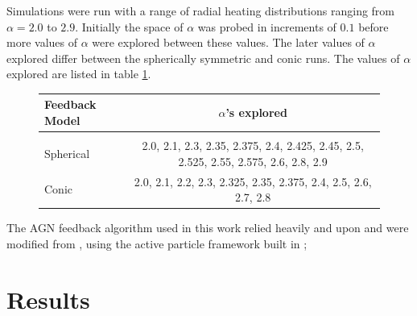 \documentclass[iop,apjl, twocolappendix]{emulateapj}   %
\begin{document}
Simulations were run with a range of radial heating distributions ranging from
$\alpha = 2.0$ to $2.9$. Initially the space of $\alpha$ was probed in
increments of $0.1$ before more values of $\alpha$ were explored between these
values. The later values of $\alpha$ explored differ between the spherically
symmetric and conic runs. The values of $\alpha$ explored are listed in table
\ref{tab:alphas}.

\begin{figure}
  \begin{center}
  \caption{\label{tab:alphas}
  }
  \begin{tabular}{ l c }
Feedback Model & $\alpha$'s explored \\
\hline\\
    Spherical & 2.0, 2.1, 2.3, 2.35, 2.375, 2.4, 2.425, 2.45, 2.5, 2.525, 2.55, 2.575, 2.6, 2.8, 2.9 \\
    Conic & 2.0, 2.1, 2.2, 2.3, 2.325, 2.35, 2.375, 2.4, 2.5, 2.6, 2.7, 2.8 
  \end{tabular}
  \end{center}
\end{figure}

The AGN feedback algorithm used in this work relied heavily and upon and were
modified from \citep{meece_jr_agn_2016,meece_triggering_2017}, using the active
particle framework built in \citep{};

\section{Results}
\label{sec:results}
\end{document}
